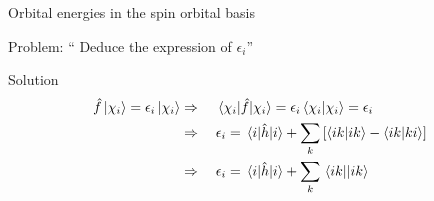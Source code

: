 \documentclass[aspectratio=169,9pt]{beamer}
\newcommand{\hH}{\hat{H}}
\newcommand{\hh}{\hat{h}}
\newcommand{\hf}{\hat{f}}
\newcommand{\violet}[1]{\textcolor{hfViolet}{#1}}
\begin{document}
\begin{frame}{Orbital energies in the spin orbital basis}
	\begin{block}{Problem:}
		\violet{`` Deduce the expression of $\epsilon_i$''}
	\end{block}
	\pause
	\begin{block}{Solution}
		\begin{align*}
			\hf \ket{\chi_i} = \epsilon_i \ket{\chi_i}
			& \Rightarrow \quad \mel{\chi_i}{\hf}{\chi_i} = \epsilon_i \braket{\chi_i}{\chi_i} = \epsilon_i
			\\
			& \Rightarrow \quad \epsilon_i = \mel{i}{\hh}{i} + \sum_k \qty[ \braket{ik}{ik} - \braket{ik}{ki} ]
			\\
			& \Rightarrow \quad \epsilon_i = \mel{i}{\hh}{i} + \sum_k \mel{ik}{}{ik}
		\end{align*}
	\end{block}
\end{frame}

\end{document}
